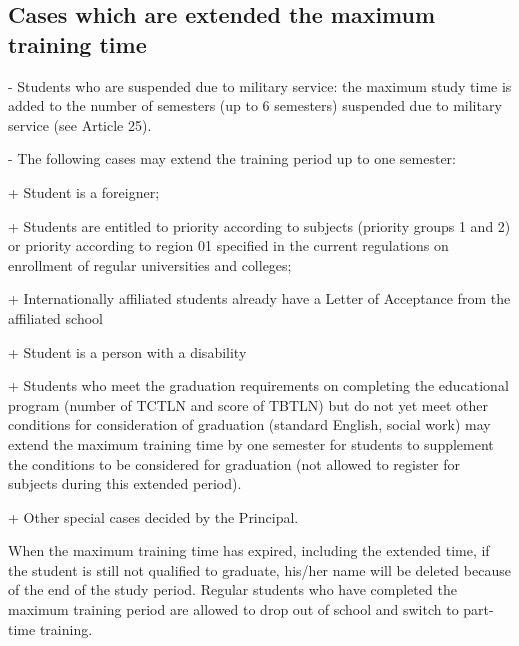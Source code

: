 \subsection{Cases which are extended the maximum training time}
- Students who are suspended due to military service: the maximum study time is added to the number of semesters (up to 6 semesters) suspended due to military service (see Article 25).

- The following cases may extend the training period up to one semester:

+ Student is a foreigner;

+ Students are entitled to priority according to subjects (priority groups 1 and 2) or priority according to region 01 specified in the current regulations on enrollment of regular universities and colleges;

+ Internationally affiliated students already have a Letter of Acceptance from the affiliated school

+ Student is a person with a disability

+ Students who meet the graduation requirements on completing the educational program (number of TCTLN and score of TBTLN) but do not yet meet other conditions for consideration of graduation (standard English, social work) may extend the maximum training time by one semester for students to supplement the conditions to be considered for graduation (not allowed to register for subjects during this extended period).

+ Other special cases decided by the Principal.

When the maximum training time has expired, including the extended time, if the student is still not qualified to graduate, his/her name will be deleted because of the end of the study period. Regular students who have completed the maximum training period are allowed to drop out of school and switch to part-time training.
